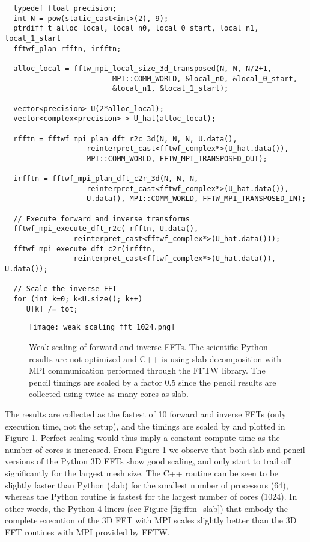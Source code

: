 \documentclass[final,3p,times,twocolumn]{elsarticle}
\begin{document}
\begin{figure*}[ht!]
\begin{lstlisting}
  typedef float precision;
  int N = pow(static_cast<int>(2), 9);
  ptrdiff_t alloc_local, local_n0, local_0_start, local_n1, local_1_start
  fftwf_plan rfftn, irfftn;

  alloc_local = fftw_mpi_local_size_3d_transposed(N, N, N/2+1,
                         MPI::COMM_WORLD, &local_n0, &local_0_start,
                         &local_n1, &local_1_start);

  vector<precision> U(2*alloc_local);
  vector<complex<precision> > U_hat(alloc_local);

  rfftn = fftwf_mpi_plan_dft_r2c_3d(N, N, N, U.data(),
                   reinterpret_cast<fftwf_complex*>(U_hat.data()),
                   MPI::COMM_WORLD, FFTW_MPI_TRANSPOSED_OUT);

  irfftn = fftwf_mpi_plan_dft_c2r_3d(N, N, N,
                   reinterpret_cast<fftwf_complex*>(U_hat.data()),
                   U.data(), MPI::COMM_WORLD, FFTW_MPI_TRANSPOSED_IN);

  // Execute forward and inverse transforms
  fftwf_mpi_execute_dft_r2c( rfftn, U.data(),
                reinterpret_cast<fftwf_complex*>(U_hat.data()));
  fftwf_mpi_execute_dft_c2r(irfftn,
                reinterpret_cast<fftwf_complex*>(U_hat.data()), U.data());

  // Scale the inverse FFT
  for (int k=0; k<U.size(); k++)
     U[k] /= tot;

\end{lstlisting}
\caption{C++ setup for the parallel FFT using FFTW.}
\label{fig:C++FFTW}
\end{figure*}




\begin{figure}[ht!]
\centering
\texttt{[image: weak\_scaling\_fft\_1024.png]}
\caption{Weak scaling of forward and inverse FFTs. The scientific Python 
results are not optimized and C++ is using slab 
decomposition with MPI communication performed through the FFTW library. The 
pencil timings are scaled by a factor 0.5 since the pencil results are 
collected using twice as many cores as slab.}
\label{fig:weak_FFT_scaling}
\end{figure}

The results are collected as the fastest of 10 forward and inverse FFTs (only 
execution time, not the setup), and the timings
are scaled by  and plotted in Figure \ref{fig:weak_FFT_scaling}. 
Perfect scaling would thus imply a constant compute time as the number of cores 
is increased. From Figure \ref{fig:weak_FFT_scaling} we observe that both slab 
and pencil versions of the Python 3D FFTs show good scaling,
and only start to trail off significantly for the largest mesh size. The C++ 
routine can be seen to be slightly faster than Python (slab) for the 
smallest number of processors (64), whereas the Python routine is fastest for 
the largest number of cores (1024). In other words, the Python 4-liners (see 
Figure \ref{fig:fftn_slab}) that embody the complete execution of the 3D FFT 
with MPI scales slightly better than the 3D FFT routines with MPI provided by 
FFTW.  
\end{document}
